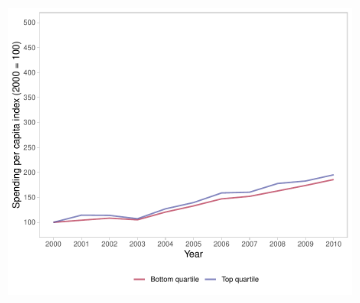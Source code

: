 \begin{figure}[h!]
\begin{center}
\begin{subfigure}{0.45\textwidth}
        \includegraphics[width=\textwidth]{plots/plot_transf.pdf}
    \end{subfigure}
    \end{center}\vspace{+1pt}
\end{figure}